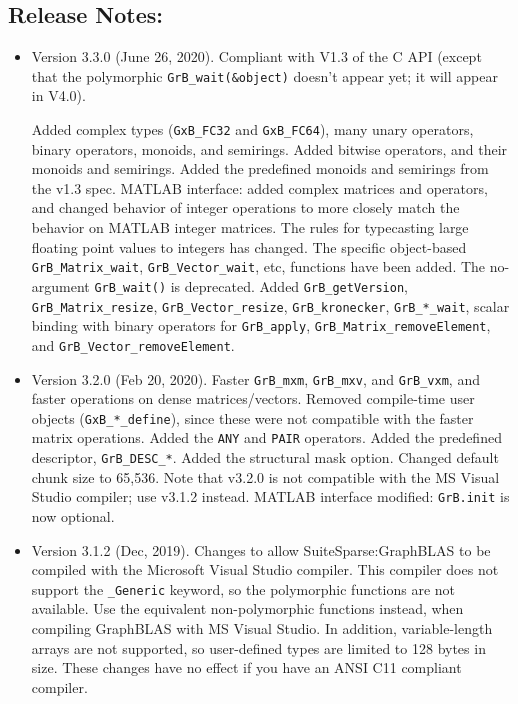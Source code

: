 \documentclass[12pt]{article}
\begin{document}
\subsection{Release Notes:}
\begin{itemize}

\item Version 3.3.0 (June 26, 2020).  Compliant with V1.3 of the C API
    (except that the polymorphic \verb'GrB_wait(&object)' doesn't appear yet;
    it will appear in V4.0).

    Added complex types (\verb'GxB_FC32' and \verb'GxB_FC64'), many unary
    operators, binary operators, monoids, and semirings.  Added bitwise
    operators, and their monoids and semirings.  Added the predefined monoids
    and semirings from the v1.3 spec.  MATLAB interface: added complex matrices
    and operators, and changed behavior of integer operations to more closely
    match the behavior on MATLAB integer matrices.  The rules for typecasting
    large floating point values to integers has changed.  The specific
    object-based \verb'GrB_Matrix_wait', \verb'GrB_Vector_wait', etc, functions
    have been added.  The no-argument \verb'GrB_wait()' is deprecated.  Added
    \verb'GrB_getVersion', \verb'GrB_Matrix_resize', \verb'GrB_Vector_resize',
    \verb'GrB_kronecker', \verb'GrB_*_wait', scalar binding with binary
    operators for \verb'GrB_apply', \verb'GrB_Matrix_removeElement', and
    \verb'GrB_Vector_removeElement'.

\item Version 3.2.0 (Feb 20, 2020).  Faster \verb'GrB_mxm', \verb'GrB_mxv', and
    \verb'GrB_vxm', and faster operations on dense matrices/vectors.  Removed
    compile-time user objects (\verb'GxB_*_define'), since these were not
    compatible with the faster matrix operations.  Added the \verb'ANY' and
    \verb'PAIR' operators.  Added the predefined descriptor, \verb'GrB_DESC_*'.
    Added the structural mask option.  Changed default chunk size to 65,536.
    Note that v3.2.0 is not compatible with the MS Visual Studio compiler; use
    v3.1.2 instead.
    MATLAB interface modified:  \verb'GrB.init' is now optional.

\item Version 3.1.2 (Dec, 2019).  Changes to allow SuiteSparse:GraphBLAS
    to be compiled with the Microsoft Visual Studio compiler.  This compiler
    does not support the \verb'_Generic' keyword, so the polymorphic functions
    are not available.  Use the equivalent non-polymorphic functions instead,
    when compiling GraphBLAS with MS Visual Studio.  In addition,
    variable-length arrays are not supported, so user-defined types are limited
    to 128 bytes in size.  These changes have no effect if you have an ANSI C11
    compliant compiler.


\end{itemize}
\end{document}
